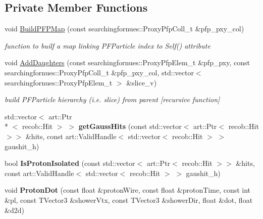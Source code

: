 \subsection*{Private Member Functions}
\begin{DoxyCompactItemize}
\item 
void \hyperlink{classProtonHitPurity_adfed832259669bb323f5a6a4eae7107e}{Build\-P\-F\-P\-Map} (const searchingfornues\-::\-Proxy\-Pfp\-Coll\-\_\-t \&pfp\-\_\-pxy\-\_\-col)
\begin{DoxyCompactList}\small\item\em function to builf a map linking P\-F\-Particle index to Self() attribute \end{DoxyCompactList}\item 
void \hyperlink{classProtonHitPurity_a7e468a256d51c80933e9bb9b6be77b94}{Add\-Daughters} (const searchingfornues\-::\-Proxy\-Pfp\-Elem\-\_\-t \&pfp\-\_\-pxy, const searchingfornues\-::\-Proxy\-Pfp\-Coll\-\_\-t \&pfp\-\_\-pxy\-\_\-col, std\-::vector$<$ searchingfornues\-::\-Proxy\-Pfp\-Elem\-\_\-t $>$ \&slice\-\_\-v)
\begin{DoxyCompactList}\small\item\em build P\-F\-Particle hierarchy (i.\-e. slice) from parent \mbox{[}recursive function\mbox{]} \end{DoxyCompactList}\item 
\hypertarget{classProtonHitPurity_af073c27c1dd243faec1019466e52dfdd}{std\-::vector$<$ art\-::\-Ptr\\*
$<$ recob\-::\-Hit $>$ $>$ {\bfseries get\-Gauss\-Hits} (const std\-::vector$<$ art\-::\-Ptr$<$ recob\-::\-Hit $>$$>$ \&hits, const art\-::\-Valid\-Handle$<$ std\-::vector$<$ recob\-::\-Hit $>$ $>$ gaushit\-\_\-h)}\label{classProtonHitPurity_af073c27c1dd243faec1019466e52dfdd}

\item 
\hypertarget{classProtonHitPurity_a8738628194b94c23f7666d3c85170a27}{bool {\bfseries Is\-Proton\-Isolated} (const std\-::vector$<$ art\-::\-Ptr$<$ recob\-::\-Hit $>$$>$ \&hits, const art\-::\-Valid\-Handle$<$ std\-::vector$<$ recob\-::\-Hit $>$ $>$ gaushit\-\_\-h)}\label{classProtonHitPurity_a8738628194b94c23f7666d3c85170a27}

\item 
\hypertarget{classProtonHitPurity_a4b71c7c7e85e49f74bc98960166d1fcc}{void {\bfseries Proton\-Dot} (const float \&proton\-Wire, const float \&proton\-Time, const int \&pl, const T\-Vector3 \&shower\-Vtx, const T\-Vector3 \&shower\-Dir, float \&dot, float \&d2d)}\label{classProtonHitPurity_a4b71c7c7e85e49f74bc98960166d1fcc}

\end{DoxyCompactItemize}
